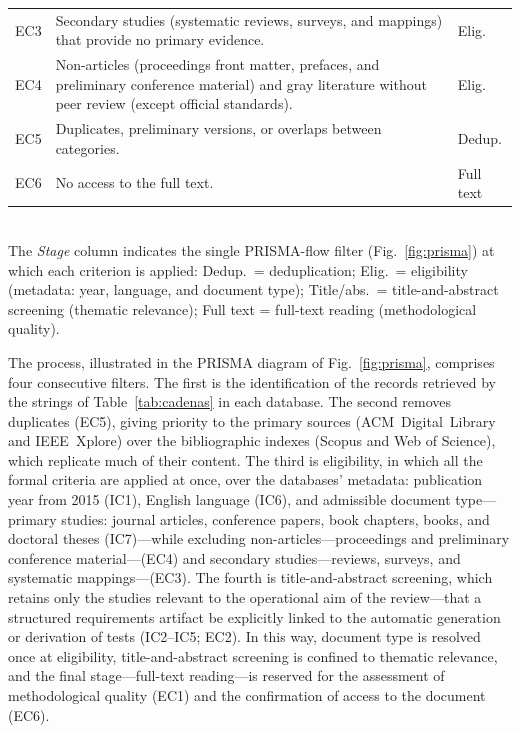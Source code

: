 \documentclass[10pt,journal,twoside,letterpaper]{IEEEtran}
\begin{document}
\begin{table}[!tb]
\begin{tabular}{@{}l>{\raggedright\arraybackslash}p{}l@{}}
            EC3 & Secondary studies (systematic reviews, surveys, and mappings) that provide no primary evidence. & Elig. \\
            EC4 & Non-articles (proceedings front matter, prefaces, and preliminary conference material) and gray literature without peer review (except official standards). & Elig. \\
            EC5 & Duplicates, preliminary versions, or overlaps between categories. & Dedup. \\
            EC6 & No access to the full text. & Full text \\
            \bottomrule
        \end{tabular}
        \\[3pt]
        {\footnotesize The \emph{Stage} column indicates the single PRISMA-flow filter (Fig.~\ref{fig:prisma}) at which each criterion is applied: Dedup.\ = deduplication; Elig.\ = eligibility (metadata: year, language, and document type); Title/abs.\ = title-and-abstract screening (thematic relevance); Full text = full-text reading (methodological quality).}
    \end{table}
    
    The process, illustrated in the PRISMA diagram of Fig.~\ref{fig:prisma}, comprises four consecutive filters. The first is the identification of the records retrieved by the strings of Table~\ref{tab:cadenas} in each database. The second removes duplicates (EC5), giving priority to the primary sources (ACM~Digital~Library and IEEE~Xplore) over the bibliographic indexes (Scopus and Web of Science), which replicate much of their content. The third is eligibility, in which all the formal criteria are applied at once, over the databases' metadata: publication year from 2015 (IC1), English language (IC6), and admissible document type---primary studies: journal articles, conference papers, book chapters, books, and doctoral theses (IC7)---while excluding non-articles---proceedings and preliminary conference material---(EC4) and secondary studies---reviews, surveys, and systematic mappings---(EC3). The fourth is title-and-abstract screening, which retains only the studies relevant to the operational aim of the review---that a structured requirements artifact be explicitly linked to the automatic generation or derivation of tests (IC2--IC5; EC2). In this way, document type is resolved once at eligibility, title-and-abstract screening is confined to thematic relevance, and the final stage---full-text reading---is reserved for the assessment of methodological quality (EC1) and the confirmation of access to the document (EC6).
    
\end{document}
